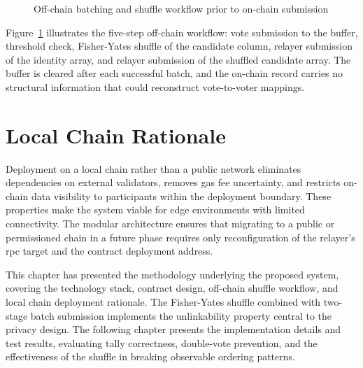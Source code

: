 \begin{figure}[htb]
\centering
    \caption{Off-chain batching and shuffle workflow prior to on-chain submission}
    \label{fig:offchain_workflow}
\end{figure}
 
Figure~\ref{fig:offchain_workflow} illustrates the five-step off-chain workflow: vote submission to the buffer, threshold check, Fisher-Yates shuffle of the candidate column, relayer submission of the identity array, and relayer submission of the shuffled candidate array. The buffer is cleared after each successful batch, and the on-chain record carries no structural information that could reconstruct vote-to-voter mappings.
 
\section{Local Chain Rationale}
 
Deployment on a local chain rather than a public network eliminates dependencies on external validators, removes gas fee uncertainty, and restricts on-chain data visibility to participants within the deployment boundary. These properties make the system viable for edge environments with limited connectivity. The modular architecture ensures that migrating to a public or permissioned chain in a future phase requires only reconfiguration of the relayer's \gls{rpc} target and the contract deployment address.
 
This chapter has presented the methodology underlying the proposed system, covering the technology stack, contract design, off-chain shuffle workflow, and local chain deployment rationale. The Fisher-Yates shuffle combined with two-stage batch submission implements the unlinkability property central to the privacy design. The following chapter presents the implementation details and test results, evaluating tally correctness, double-vote prevention, and the effectiveness of the shuffle in breaking observable ordering patterns.
 